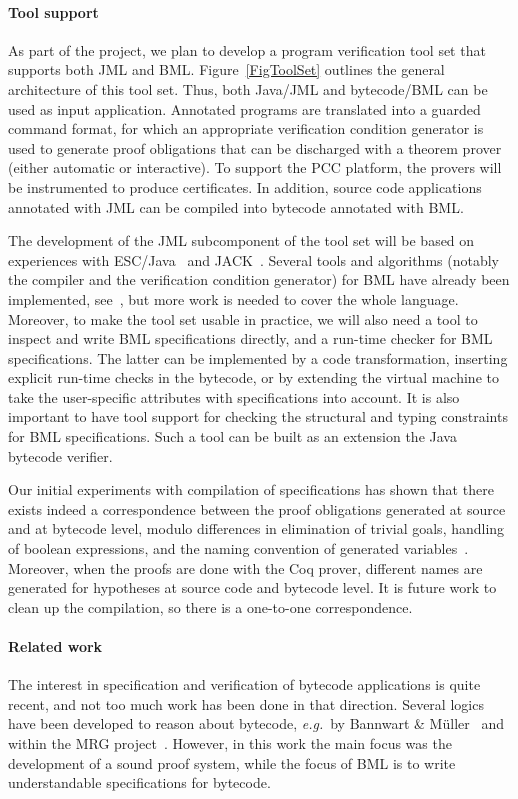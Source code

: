 \paragraph{Tool support}
As part of the \mobius project, we plan to develop a program
verification tool set that supports both JML and
BML. Figure~\ref{FigToolSet} outlines the general architecture of this
tool set. Thus, both Java/JML and bytecode/BML can be used as input
application. Annotated programs are translated into a guarded
command format, for which an appropriate verification condition
generator is used to generate proof obligations that can be discharged
with a theorem prover (either automatic or interactive). To support
the PCC platform, the provers will be instrumented to produce
certificates. In addition, source code applications annotated with JML
can be compiled into bytecode annotated with BML.

The development of the JML subcomponent of the tool set will be based
on experiences with ESC/Java~\cite{CokK04} and JACK~\cite{BurdyRL03}.
Several tools and algorithms (notably the compiler and the
verification condition generator) for BML have already been
implemented, see~\cite{BP06JSV,Pavlova:phd}, but more work is needed
to cover the whole language. Moreover, to make the tool set usable in
practice, we will also need a tool to inspect and write BML
specifications directly, and a run-time checker for BML
specifications. The latter can be implemented by a code
transformation, inserting explicit run-time checks in the bytecode, or
by extending the virtual machine to take the user-specific attributes
with specifications into account.  It is also important to have tool
support for checking the structural and typing constraints for BML
specifications. Such a tool can be built as an extension the Java
bytecode verifier.

Our initial experiments with compilation of specifications has shown
that there exists indeed a correspondence between the proof
obligations generated at source and at bytecode level, modulo
differences in elimination of trivial goals, handling of boolean
expressions, and the naming convention of generated
variables~\cite{Pavlova:phd}. Moreover, when the proofs are done with
the Coq prover, different names are generated for hypotheses at source
code and bytecode level. It is future work to clean up the
compilation, so there is a one-to-one correspondence.




 

\paragraph{Related work}
The interest in specification and verification of bytecode
applications is quite recent, and not too much work has been done in
that direction. Several logics have been developed to reason about
bytecode, \emph{e.g.}~by Bannwart \& M\"uller~\cite{BannwartMueller05}
and within the MRG project~\cite{AspinallEtAl:TPHOLs2004}. However, in
this work the main focus was the development of a sound proof system,
while the focus of BML is to write understandable specifications for
bytecode.

